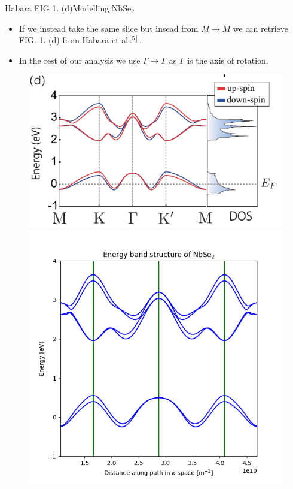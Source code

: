 \documentclass[9pt]{beamer}
\begin{document}
\begin{frame}{Habara FIG 1. (d)}{Modelling NbSe$_2$}
  \begin{itemize}
    \item If we instead take the same slice but insead from $M \rightarrow M$ we can retrieve FIG. 1. (d) from Habara et al$^{[5]}$.

    \item In the rest of our analysis we use $\Gamma \rightarrow \Gamma$ as $\Gamma$ is the axis of rotation.
  \end{itemize}

  \begin{figure}
  \centering
  \begin{minipage}{.5\textwidth}
    \centering
    \includegraphics[width=.9\linewidth]{Habara_evalues.png}
  \end{minipage}%
  \begin{minipage}{.5\textwidth}
    \centering
    \includegraphics[width=.9\linewidth]{our_Habara_evalues.png}
  \end{minipage}
  \end{figure}
\end{frame}
\end{document}
